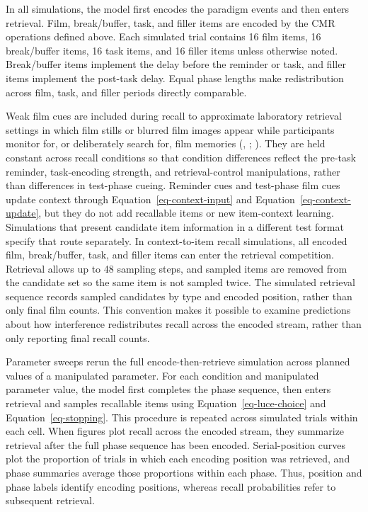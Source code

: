 \documentclass[
  man,
  floatsintext,
  longtable,
  nolmodern,
  notxfonts,
  notimes,
  draftfirst,
  colorlinks=true,linkcolor=blue,citecolor=blue,urlcolor=blue]{apa7}
\begin{document}
In all simulations, the model first encodes the paradigm events and then
enters retrieval. Film, break/buffer, task, and filler items are encoded
by the CMR operations defined above. Each simulated trial contains 16
film items, 16 break/buffer items, 16 task items, and 16 filler items
unless otherwise noted. Break/buffer items implement the delay before
the reminder or task, and filler items implement the post-task delay.
Equal phase lengths make redistribution across film, task, and filler
periods directly comparable.

Weak film cues are included during recall to approximate laboratory
retrieval settings in which film stills or blurred film images appear
while participants monitor for, or deliberately search for, film
memories (,
;
). They are
held constant across recall conditions so that condition differences
reflect the pre-task reminder, task-encoding strength, and
retrieval-control manipulations, rather than differences in test-phase
cueing. Reminder cues and test-phase film cues update context through
Equation~\ref{eq-context-input} and Equation~\ref{eq-context-update},
but they do not add recallable items or new item-context learning.
Simulations that present candidate item information in a different test
format specify that route separately. In context-to-item recall
simulations, all encoded film, break/buffer, task, and filler items can
enter the retrieval competition. Retrieval allows up to 48 sampling
steps, and sampled items are removed from the candidate set so the same
item is not sampled twice. The simulated retrieval sequence records
sampled candidates by type and encoded position, rather than only final
film counts. This convention makes it possible to examine predictions
about how interference redistributes recall across the encoded stream,
rather than only reporting final recall counts.

Parameter sweeps rerun the full encode-then-retrieve simulation across
planned values of a manipulated parameter. For each condition and
manipulated parameter value, the model first completes the phase
sequence, then enters retrieval and samples recallable items using
Equation~\ref{eq-luce-choice} and Equation~\ref{eq-stopping}. This
procedure is repeated across simulated trials within each cell. When
figures plot recall across the encoded stream, they summarize retrieval
after the full phase sequence has been encoded. Serial-position curves
plot the proportion of trials in which each encoding position was
retrieved, and phase summaries average those proportions within each
phase. Thus, position and phase labels identify encoding positions,
whereas recall probabilities refer to subsequent retrieval.
\end{document}
